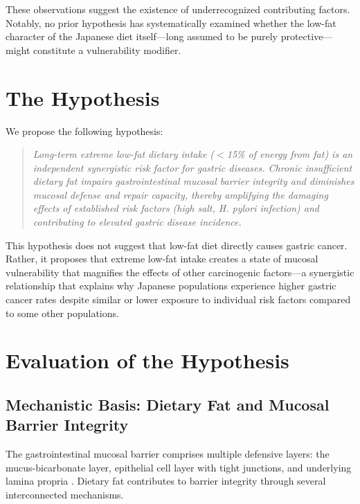 \documentclass[review]{elsarticle}
\begin{document}
These observations suggest the existence of underrecognized contributing factors. Notably, no prior hypothesis has systematically examined whether the low-fat character of the Japanese diet itself---long assumed to be purely protective---might constitute a vulnerability modifier.

\section{The Hypothesis}

We propose the following hypothesis:

\begin{quote}
\textit{Long-term extreme low-fat dietary intake ($<$15\% of energy from fat) is an independent synergistic risk factor for gastric diseases. Chronic insufficient dietary fat impairs gastrointestinal mucosal barrier integrity and diminishes mucosal defense and repair capacity, thereby amplifying the damaging effects of established risk factors (high salt, \textit{H. pylori} infection) and contributing to elevated gastric disease incidence.}
\end{quote}

This hypothesis does not suggest that low-fat diet directly causes gastric cancer. Rather, it proposes that extreme low-fat intake creates a state of mucosal vulnerability that magnifies the effects of other carcinogenic factors---a synergistic relationship that explains why Japanese populations experience higher gastric cancer rates despite similar or lower exposure to individual risk factors compared to some other populations.

\section{Evaluation of the Hypothesis}

\subsection{Mechanistic Basis: Dietary Fat and Mucosal Barrier Integrity}

The gastrointestinal mucosal barrier comprises multiple defensive layers: the mucus-bicarbonate layer, epithelial cell layer with tight junctions, and underlying lamina propria \cite{turner2009}. Dietary fat contributes to barrier integrity through several interconnected mechanisms.
\end{document}
